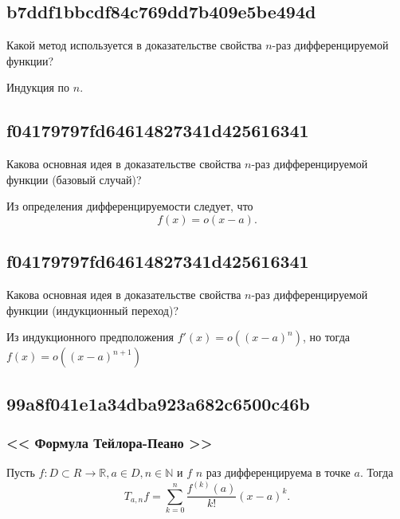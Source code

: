 \documentclass[11pt, a5paper]{article}
\newenvironment{note}[1]{\goodbreak\par\subsection{\hfill \color{lightgray}\tiny #1}}{}
\newenvironment{cloze}[2][\ldots]{\begin{leftbar}}{\end{leftbar}}
\newenvironment{icloze}[2][\ldots]{%
  \ignorespaces\text{\tiny \color{lightgray} \{\{c#2:: }%
}{%
  \text{\tiny \color{lightgray}\}\}}\unskip%
}
\begin{document}
\begin{note}{b7ddf1bbcdf84c769dd7b409e5be494d}
    Какой метод используется в доказательстве свойства \( n \)-раз дифференцируемой функции?

    \begin{cloze}{1}
        Индукция по \( n. \)
    \end{cloze}
\end{note}

\begin{note}{f04179797fd64614827341d425616341}
    Какова основная идея в доказательстве свойства \( n \)-раз дифференцируемой функции (базовый случай)?

    \begin{cloze}{1}
        Из определения дифференцируемости следует, что \[ f(x) = o(x - a). \]
    \end{cloze}
\end{note}

\begin{note}{f04179797fd64614827341d425616341}
    Какова основная идея в доказательстве свойства \( n \)-раз дифференцируемой функции (индукционный переход)?

    \begin{cloze}{1}
        Из индукционного предположения \( f'(x) = o((x - a)^{n} ) \), но тогда \( f(x) = o((x - a)^{n + 1} ) \)
    \end{cloze}
\end{note}

\begin{note}{99a8f041e1a34dba923a682c6500c46b}
    \subsubsection{<<\begin{icloze}{3}Формула Тейлора-Пеано\end{icloze}>>}

    Пусть \begin{icloze}{2}\( f : D \subset R \to \mathbb R, a \in D, n \in \mathbb N \) и \( f \) \( n \) раз дифференцируема в точке \( a. \)  \end{icloze}
    Тогда \begin{icloze}{1}\[
        T_{a, n} f = \sum_{k=0}^{n} \frac{f^{(k)} (a)}{k!} (x - a)^{k}.
    \]\end{icloze}
\end{note}
\end{document}
